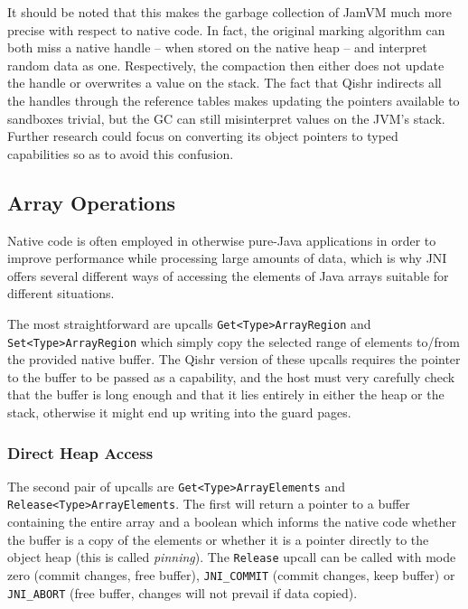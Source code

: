 \documentclass[a4paper,12pt,twoside,openright]{report}
\begin{document}
It should be noted that this makes the garbage collection of JamVM much more precise with respect to native code. In fact, the original marking algorithm can both miss a native handle -- when stored on the native heap -- and interpret random data as one. Respectively, the compaction then either does not update the handle or overwrites a value on the stack. The fact that Qishr indirects all the handles through the reference tables makes updating the pointers available to sandboxes trivial, but the GC can still misinterpret values on the JVM's stack. Further research could focus on converting its object pointers to typed capabilities so as to avoid this confusion.

\subsection{Array Operations}

Native code is often employed in otherwise pure-Java applications in order to improve performance while processing large amounts of data, which is why JNI offers several different ways of accessing the elements of Java arrays suitable for different situations.

The most straightforward are upcalls \texttt{Get\-<Type>\-Array\-Region} and \texttt{Set\-<Type>\-Array\-Region} which simply copy the selected range of elements to/from the provided native buffer. The Qishr version of these upcalls requires the pointer to the buffer to be passed as a capability, and the host must very carefully check that the buffer is long enough and that it lies entirely in either the heap or the stack, otherwise it might end up writing into the guard pages. 

\subsubsection{Direct Heap Access}
\label{sec:DirectHeapAccess}

The second pair of upcalls are \texttt{Get\-<Type>\-Array\-Elements} and \texttt{Release\-<Type>\-Array\-Elements}. The first will return a pointer to a buffer containing the entire array and a boolean which informs the native code whether the buffer is a copy of the elements or whether it is a pointer directly to the object heap (this is called \emph{pinning}). The \texttt{Release} upcall can be called with mode zero (commit changes, free buffer), \texttt{JNI\_COMMIT} (commit changes, keep buffer) or \texttt{JNI\_ABORT} (free buffer, changes will not prevail if data copied). 
\end{document}
